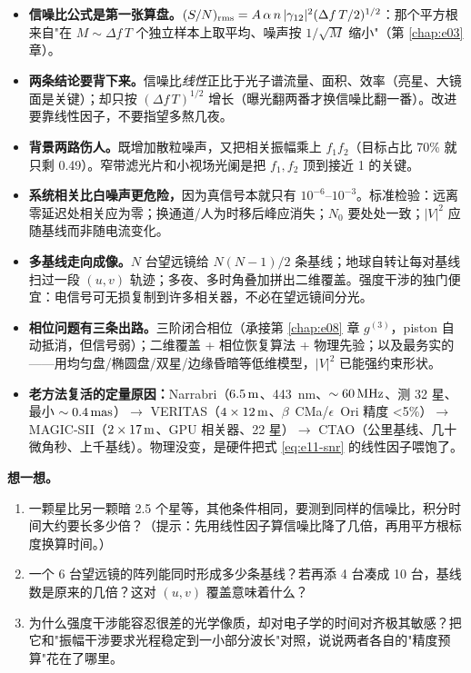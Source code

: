\begin{itemize}
  \item \textbf{信噪比公式是第一张算盘。}\((S/N)_{\rm rms}=A\,\alpha\,n\,|\gamma_{12}|^2(\Delta f\,T/2)^{1/2}\)：那个平方根来自"在 \(M\sim\Delta f\,T\) 个独立样本上取平均、噪声按 \(1/\sqrt{M}\) 缩小"（第 \ref{chap:e03} 章）。
  \item \textbf{两条结论要背下来。}信噪比\emph{线性}正比于光子谱流量、面积、效率（亮星、大镜面是关键）；却只按 \((\Delta f\,T)^{1/2}\) 增长（曝光翻两番才换信噪比翻一番）。改进要靠线性因子，不要指望多熬几夜。
  \item \textbf{背景两路伤人。}既增加散粒噪声，又把相关振幅乘上 \(f_1f_2\)（目标占比 70\% 就只剩 0.49）。窄带滤光片和小视场光阑是把 \(f_1,f_2\) 顶到接近 1 的关键。
  \item \textbf{系统相关比白噪声更危险，}因为真信号本就只有 \(10^{-6}\)–\(10^{-3}\)。标准检验：远离零延迟处相关应为零；换通道/人为时移后峰应消失；\(N_0\) 要处处一致；\(|V|^2\) 应随基线而非随电流变化。
  \item \textbf{多基线走向成像。}\(N\) 台望远镜给 \(N(N-1)/2\) 条基线；地球自转让每对基线扫过一段 \((u,v)\) 轨迹；多夜、多时角叠加拼出二维覆盖。强度干涉的独门便宜：电信号可无损复制到许多相关器，不必在望远镜间分光。
  \item \textbf{相位问题有三条出路。}三阶闭合相位（承接第 \ref{chap:e08} 章 \(g^{(3)}\)，piston 自动抵消，但信号弱）；二维覆盖 + 相位恢复算法 + 物理先验；以及最务实的——用均匀盘/椭圆盘/双星/边缘昏暗等低维模型，\(|V|^2\) 已能强约束形状。
  \item \textbf{老方法复活的定量原因：}Narrabri（\(6.5\,{\rm m}\)、443~nm、\(\sim60\,{\rm MHz}\)、测 32 星、最小 \(\sim0.4\,{\rm mas}\)）\(\to\) VERITAS（\(4\times12\,{\rm m}\)、\(\beta\)~CMa/\(\epsilon\)~Ori 精度 <5\%）\(\to\) MAGIC-SII（\(2\times17\,{\rm m}\)、GPU 相关器、22 星）\(\to\) CTAO（公里基线、几十微角秒、上千基线）。物理没变，是硬件把式 \eqref{eq:e11-snr} 的线性因子喂饱了。
\end{itemize}

\medskip
\noindent\textbf{想一想。}
\begin{enumerate}
  \item 一颗星比另一颗暗 2.5 个星等，其他条件相同，要测到同样的信噪比，积分时间大约要长多少倍？（提示：先用线性因子算信噪比降了几倍，再用平方根标度换算时间。）
  \item 一个 6 台望远镜的阵列能同时形成多少条基线？若再添 4 台凑成 10 台，基线数是原来的几倍？这对 \((u,v)\) 覆盖意味着什么？
  \item 为什么强度干涉能容忍很差的光学像质，却对电子学的时间对齐极其敏感？把它和"振幅干涉要求光程稳定到一小部分波长"对照，说说两者各自的"精度预算"花在了哪里。
\end{enumerate}
